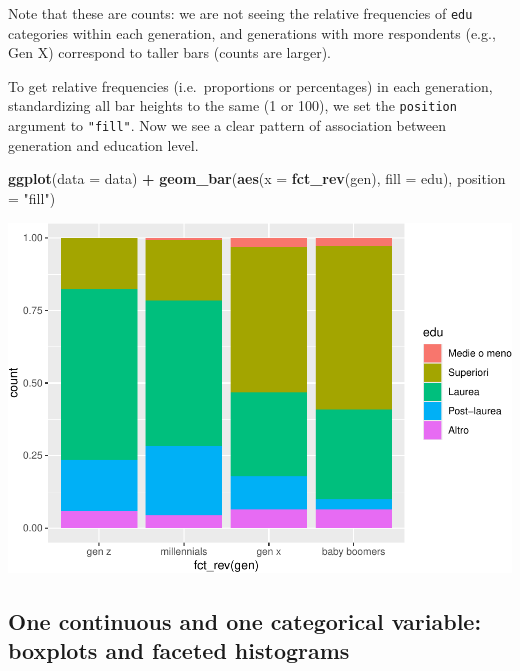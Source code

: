 \documentclass[
]{book}
\newenvironment{Shaded}{\begin{snugshade}}{\end{snugshade}}
\newcommand{\AttributeTok}[1]{\textcolor[rgb]{0.13,0.29,0.53}{#1}}
\newcommand{\FunctionTok}[1]{\textcolor[rgb]{0.13,0.29,0.53}{\textbf{#1}}}
\newcommand{\NormalTok}[1]{#1}
\newcommand{\SpecialCharTok}[1]{\textcolor[rgb]{0.81,0.36,0.00}{\textbf{#1}}}
\newcommand{\StringTok}[1]{\textcolor[rgb]{0.31,0.60,0.02}{#1}}
\begin{document}
Note that these are counts: we are not seeing the relative frequencies of \texttt{edu} categories within each generation, and generations with more respondents (e.g., Gen X) correspond to taller bars (counts are larger).

To get relative frequencies (i.e.~proportions or percentages) in each generation, standardizing all bar heights to the same (1 or 100), we set the \texttt{position} argument to \texttt{"fill"}. Now we see a clear pattern of association between generation and education level.

\begin{Shaded}
\begin{Highlighting}[]
\FunctionTok{ggplot}\NormalTok{(}\AttributeTok{data =}\NormalTok{ data) }\SpecialCharTok{+}
  \FunctionTok{geom\_bar}\NormalTok{(}\FunctionTok{aes}\NormalTok{(}\AttributeTok{x =} \FunctionTok{fct\_rev}\NormalTok{(gen), }\AttributeTok{fill =}\NormalTok{ edu), }\AttributeTok{position =} \StringTok{"fill"}\NormalTok{)}
\end{Highlighting}
\end{Shaded}

\includegraphics{R-for-social-research-and-business-analytics_files/figure-latex/unnamed-chunk-40-1.pdf}

\hypertarget{one-continuous-and-one-categorical-variable-boxplots-and-faceted-histograms}{%
\subsection{One continuous and one categorical variable: boxplots and faceted histograms}\label{one-continuous-and-one-categorical-variable-boxplots-and-faceted-histograms}}
\end{document}
